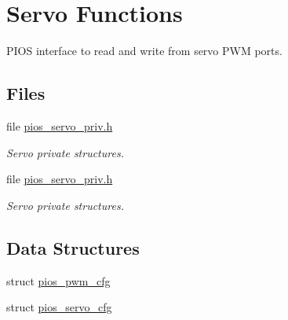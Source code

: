 \hypertarget{group___p_i_o_s___s_e_r_v_o}{\section{Servo Functions}
\label{group___p_i_o_s___s_e_r_v_o}
}


P\-I\-O\-S interface to read and write from servo P\-W\-M ports.  


\subsection*{Files}
\begin{DoxyCompactItemize}
\item 
file \hyperlink{pios__servo__priv_8h}{pios\-\_\-servo\-\_\-priv.\-h}
\begin{DoxyCompactList}\small\item\em Servo private structures. \end{DoxyCompactList}\item 
file \hyperlink{pios__servo__priv_8h}{pios\-\_\-servo\-\_\-priv.\-h}
\begin{DoxyCompactList}\small\item\em Servo private structures. \end{DoxyCompactList}\end{DoxyCompactItemize}
\subsection*{Data Structures}
\begin{DoxyCompactItemize}
\item 
struct \hyperlink{structpios__pwm__cfg}{pios\-\_\-pwm\-\_\-cfg}
\item 
struct \hyperlink{structpios__servo__cfg}{pios\-\_\-servo\-\_\-cfg}
\end{DoxyCompactItemize}
